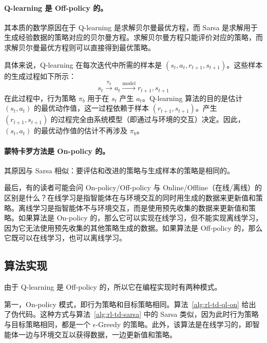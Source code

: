 \paragraph{Q-learning 是 Off-policy 的。}
其本质的数学原因在于 Q-learning 是求解贝尔曼最优方程，而 Sarsa 是求解用于生成经验数据的策略对应的贝尔曼方程。求解贝尔曼方程只能评价对应的策略，而求解贝尔曼最优方程则可以直接得到最优策略。

具体来说，Q-learning 在每次迭代中所需的样本是 $(s_t, a_t, r_{t+1}, s_{t+1})$。这些样本的生成过程如下所示：
\[
  s_t \xrightarrow{\pi_b} a_t \xrightarrow{\mathrm{model}} r_{t+1}, s_{t+1}
\]
在此过程中，行为策略 $\pi_b$ 用于在 $s_t$ 产生 $a_t$。Q-learning 算法的目的是估计 $(s_t, a_t)$ 的最优动作值，这一过程依赖于样本 $(r_{t+1}, s_{t+1})$。产生 $(r_{t+1}, s_{t+1})$ 的过程完全由系统模型（即通过与环境的交互）决定。因此，$(s_t, a_t)$ 的最优动作值的估计不再涉及 $\pi_b$。

\paragraph{蒙特卡罗方法是 On-policy 的。}
其原因与 Sarsa 相似：要评估和改进的策略与生成样本的策略是相同的。

最后，有的读者可能会问 On-policy/Off-policy 与 Online/Offline（在线/离线）的区别是什么？在线学习是指智能体在与环境交互的同时用生成的数据来更新值和策略。离线学习是指智能体不与环境交互，而是使用预先收集的数据来更新值和策略。如果算法是 On-policy 的，那么它可以实现在线学习，但不能实现离线学习，因为它无法使用预先收集的其他策略生成的数据。如果算法是 Off-policy 的，那么它既可以在线学习，也可以离线学习。

\subsection{算法实现}
\label{sec:rl-td-ql-impl}

由于 Q-learning 是 Off-policy 的，所以它在编程实现时有两种模式。

第一，On-policy 模式，即行为策略和目标策略相同。算法~\ref{alg:rl-td-ql-on} 给出了伪代码。这种方式与算法~\ref{alg:rl-td-sarsa} 中的 Sarsa 类似，因为此时行为策略与目标策略相同，都是一个 $\epsilon$-Greedy 的策略。此外，该算法是在线学习的，即智能体一边与环境交互以获得数据，一边更新值和策略。

